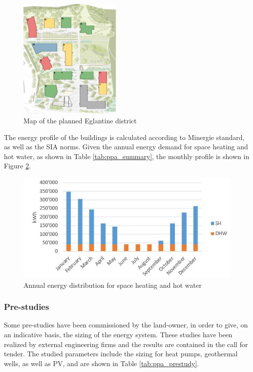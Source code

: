 \documentclass{article}
\begin{document}



\begin{figure}[h!]
\centering
\includegraphics[width=0.45\textwidth]{ppa_buildings.JPG}
\caption{Map of the planned Eglantine district}
\label{fig:ppa_buildings}
\end{figure}

The energy profile of the buildings is calculated according to Minergie standard, as well as the SIA norms. Given the annual energy demand for space heating and hot water, as shown in Table \ref{tab:ppa_summary}, the monthly profile is shown in Figure \ref{fig:ppa_energydemand}.

\begin{figure}[h!]
\centering
\includegraphics[width=1\textwidth]{ppa_energydemand.JPG}
\caption{Annual energy distribution for space heating and hot water}
\label{fig:ppa_energydemand}
\end{figure}


\subsubsection{Pre-studies}
Some pre-studies have been commissioned by the land-owner, in order to give, on an indicative basis, the sizing of the energy system. These studies have been realized by external engineering firms and the results are contained in the call for tender. The studied parameters include the sizing for heat pumps, geothermal wells, as well as PV, and are shown in Table \ref{tab:ppa_prestudy}.

\end{document}
